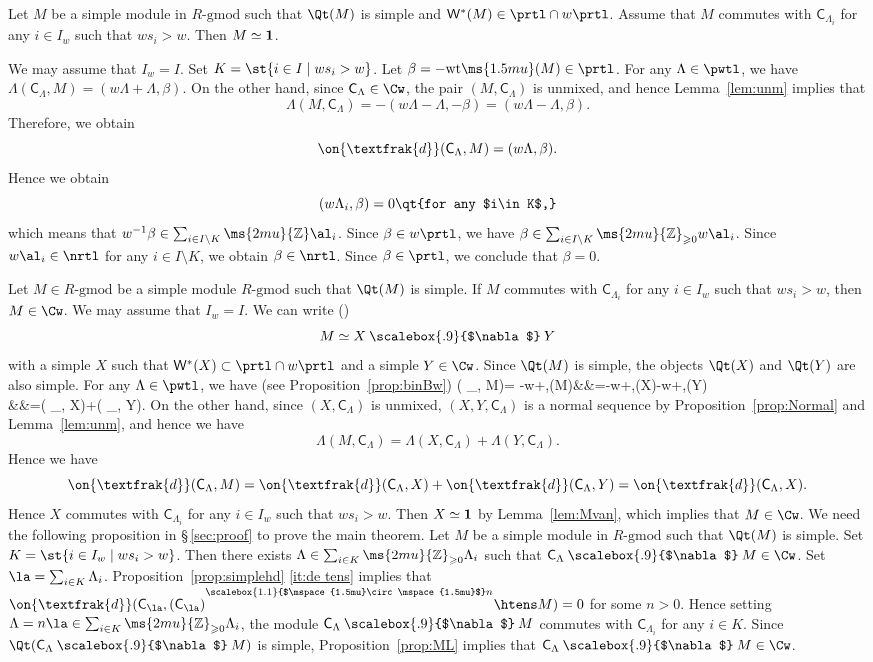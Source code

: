 \documentclass[12pt,leqno]{amsart}%
\renewcommand{\ge}{\geqslant}
\theoremstyle{plain}
\theoremstyle{definition}
\newcommand{\Z}{\ms{2mu}{\mathbb Z}}
\newcommand{\one}{{\bf{1}}}
\newcommand{\gmod}{\text{-}\mathrm{gmod}}
\newcommand{\conv}[1][]{
\underset{\raisebox{.5ex}{$\scriptstyle{#1}$}}{\mathbin{\scalebox{1.1}{$\mspace{1.5mu}\circ\mspace{1.5mu}$}}}}
\newcommand{\hconv}{\mathbin{\scalebox{.9}{$\nabla$}}}
\newcommand{\de}{\on{\textfrak{d}}}
\newcommand{\wt}{\mathrm{wt}\ms{1.5mu}} 		%
\newcommand{\dC}{ \mathsf{C }}              %
\newcommand{\gW}{\mathsf{W}}
\newcommand{\La}{\Lambda} 			%
\numberwithin{equation}{section}
\begin{document}
\Lemma\label{lem:Mvan}
Let $M$ be a simple module in $R\gmod$ such that $\Qt(M)$ is simple and 
$\gW^*(M)\in\prtl\cap w\prtl$.
Assume that $M$ commutes with $\dC_{\La_i}$ for any $i\in I_w$ such that $ws_i>w$.
Then $M\simeq\one$.
\enlemma

\Proof
We may assume that $I_w=I$.
Set $K=\st{i\in I\mid ws_i>w}$.
Let $\beta=-\wt(M)\in\prtl$.
For any $\La\in\pwtl$, we have
$\La(\dC_\La,M)=(w\La+\La,\beta)$.
On the other hand, since $\dC_\La\in\Cw$, the pair $(M,\dC_\La)$ is unmixed, and hence Lemma~\ref{lem:unm} implies that
$$\La(M,\dC_\La)=-(w\La-\La,-\beta)=(w\La-\La,\beta).$$
Therefore, we obtain
$$\de(\dC_\La,M)=(w\La,\beta).$$
Hence we obtain
$$(w\La_i,\beta)=0\qt{for any $i\in K$,}$$
which means that
$w^{-1}\beta\in \sum_{i\in I\setminus K}\Z\al_i$.
Since $\beta\in w\prtl$, we have
$\beta\in \sum_{i\in I\setminus K}\Z_{\ge0}w\al_i$.
Since $w\al_i\in\nrtl$ for any $i\in I\setminus K$, we obtain
$\beta\in\nrtl$. Since $\beta\in \prtl$, we conclude that $\beta=0$.
\QED


\Prop\label{prop:ML}
Let $M\in R\gmod$ be a simple module $R\gmod$ such that $\Qt(M)$ is simple.
If $M$ commutes with $\dC_{\La_i}$ for any $i\in I_w$ such that $ws_i>w$,
then $M\in\Cw$.
\enprop
\Proof
We may assume that $I_w=I$.
We can write (\cite{TW16})
$$M\simeq X\hconv Y$$
with a simple $X$ such that $\gW^*(X)\subset\prtl\cap w\prtl$
and a simple $Y\in\Cw$.
Since $\Qt(M)$ is simple, the objects
$\Qt(X)$ and $\Qt(Y)$ are also simple.
For any $\La\in\pwtl$, we have (see Proposition~\ref{prop:binBw})
\eqn
\La(\dC_\La, M)=
-\bl w\La+\La,\wt(M)\br&&=-\bl w\La+\La,\wt(X)\br-\bl w\La+\La,\wt(Y)\br\\
&&=\La(\dC_\La, X)+\La(\dC_\La, Y).\eneqn
On the other hand, since $(X,\dC_\La)$ is unmixed, $(X,Y,\dC_\La)$ is a normal sequence by Proposition~\ref{prop:Normal} and Lemma~\ref{lem:unm}, and hence we have
$$\La(M,\dC_\La)=\La(X,\dC_\La)+\La(Y,\dC_\La).$$
Hence we have
$$\de(\dC_\La,M)=\de(\dC_\La,X)+\de(\dC_\La,Y)=\de(\dC_\La,X).$$
Hence $X$ commutes with $\dC_{\La_i}$ for any $i\in I_w$ such that $ws_i>w$.
Then $X\simeq\one$ by Lemma~\ref{lem:Mvan},
which implies that $M\in\Cw$.
\QED
We need the following proposition in \S\,\ref{sec:proof} to prove the main theorem.
\Prop\label{prop:MCw}
Let $M$ be a simple module in $R\gmod$ such that $\Qt(M)$ is simple.
Set $K=\st{i\in I_w\mid ws_i>w}$.
Then there exists
$\La\in\sum_{i\in K}\Z_{\ge0}\La_i$ such that
$\dC_\La\hconv M\in\Cw$.
\enprop
\Proof
Set $\la=\sum_{i\in K}\La_i$.
Proposition~\ref{prop:simplehd} \eqref{it:de tens} 
implies that $\de(\dC_{\la},(\dC_{\la})^{\conv n}\htens M)=0$ for some $n>0$. 
Hence
setting $\La=n\la\in\sum_{i\in K}\Z_{\ge0}\La_i$,
the module $\dC_\La\hconv M$ commutes with $\dC_{\La_i}$
for any $i\in K$.
Since $\Qt(\dC_\La\hconv M)$ is simple, Proposition~\ref{prop:ML} implies that $\dC_\La\hconv M\in\Cw$.
\QED
\end{document}
